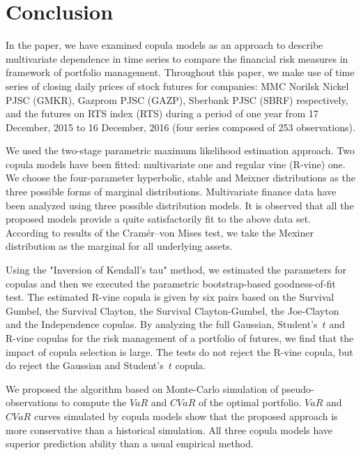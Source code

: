 \documentclass{llncs}
\begin{document}
\section{Conclusion}

In the paper, we have examined copula models as an approach to describe  multivariate dependence in time series to compare the financial risk measures in framework of portfolio management.
Throughout this paper, we make use of %
time series of closing daily prices of stock futures %
for companies: MMC Norilsk Nickel PJSC (GMKR), Gazprom PJSC
(GAZP), Sberbank PJSC (SBRF) respectively, and the futures on RTS
index (RTS) during a period of one year from 17 December, 2015 to
16 December, 2016 
(four series composed of 253 observations).

We used the two-stage parametric maximum likelihood estimation approach. Two copula models have been fitted: multivariate one and regular vine (R-vine) one. We choose the four-parameter hyperbolic, stable and Meixner distributions as the three possible forms of marginal distributions.
Multivariate finance data have been analyzed using three possible distribution models. It is observed that all the proposed models provide a quite satisfactorily fit to the above data set. According to results of the Cramér–von Mises test, we take the Mexiner distribution as the marginal for all underlying assets. 

Using the "Inversion of Kendall’s tau" method, we estimated the parameters for 
copulas and then we executed the parametric
bootstrap-based goodness-of-fit test. The estimated
R-vine copula is given by six pairs based on the Survival Gumbel,
the Survival Clayton, the Survival Clayton-Gumbel, the Joe-Clayton and the Independence copulas. 
%
By analyzing the full Gaussian, Student’s~$t$ and R-vine copulas for the risk management of a portfolio of futures, we find that the impact of copula selection is large. The tests do not reject the R-vine copula, but do reject the Gaussian and  Student’s~$t$ copula.

We proposed the algorithm based on Monte-Carlo simulation of pseudo-observations to compute the $VaR$ and $CVaR$ of the optimal portfolio.  $VaR$ and $CVaR$ curves simulated by copula models 
show that the proposed approach is more conservative than a historical simulation. %
All three copula models have superior %
prediction ability than a usual empirical method.
\end{document}

